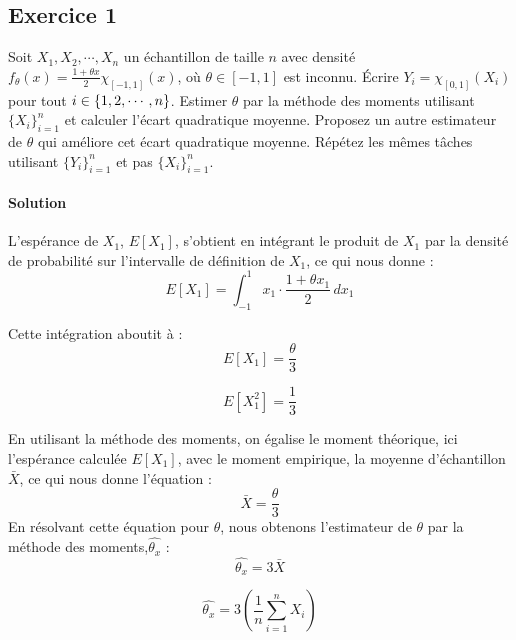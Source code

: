 \documentclass[../main.tex]{subfiles}
\begin{document}
\begin{CJK*}{UTF8}{gbsn}

\section*{Exercice 1}

Soit $X_1, X_2, \cdots, X_n$ un échantillon de taille $n$ avec densité 
$f_{\theta}(x) = \frac{1 + \theta x}{2} \chi_{[-1,1]}(x)$, 
où $\theta \in [-1,1]$ est inconnu. Écrire $Y_i = \chi_{[0,1]}(X_i)$
pour tout $i \in \left \{  1, 2, \cdots, n \right \}$.
Estimer $\theta$ par la méthode des moments utilisant $\{X_i\}_{i=1}^n$ et 
calculer l'écart quadratique moyenne. 
Proposez un autre estimateur de $\theta$ qui améliore cet écart quadratique moyenne.
Répétez les mêmes tâches utilisant $\{Y_i\}_{i=1}^n$ et pas $\{X_i\}_{i=1}^n$.

\paragraph{Solution}

L'espérance de $X_1$, $E[X_1]$, s'obtient en intégrant le produit de $X_1$ par la densité de probabilité sur l'intervalle de définition de $X_1$, ce qui nous donne :
\begin{equation*}
E[X_1] = \int_{-1}^{1} x_1 \cdot \frac{1 + \theta x_1}{2} \, dx_1
\end{equation*}

Cette intégration aboutit à :
\begin{equation*}
E[X_1] = \frac{\theta}{3} 
\end{equation*}

\begin{equation*}
E[X_1^2] = \frac{1}{3} 
\end{equation*}

En utilisant la méthode des moments, on égalise le moment théorique, ici l'espérance calculée $E[X_1]$, avec le moment empirique,
la moyenne d'échantillon $\bar{X}$, ce qui nous donne l'équation :
\begin{equation*}
\bar{X} = \frac{\theta}{3}
\end{equation*}
En résolvant cette équation pour $\theta$, nous obtenons l'estimateur de $\theta$ par la méthode des moments,$\hat{\theta_x}$ :
\begin{equation*}
\hat{\theta_x} = 3\bar{X}
\end{equation*}

\begin{equation*}
\hat{\theta_x} = 3\left(\frac{1}{n}\sum_{i=1}^{n}X_i\right)
\end{equation*}


\end{CJK*}
\end{document}
